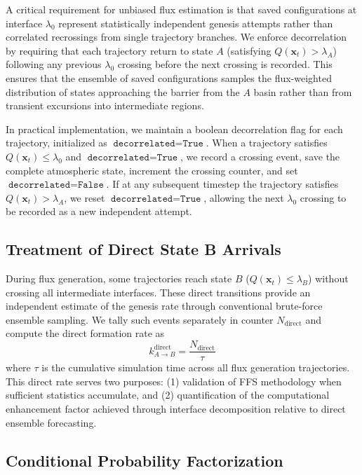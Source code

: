 \documentclass[11pt]{article}
\begin{document}
A critical requirement for unbiased flux estimation is that saved configurations at interface $\lambda_0$ represent statistically independent genesis attempts rather than correlated recrossings from single trajectory branches. We enforce decorrelation by requiring that each trajectory return to state $A$ (satisfying $Q(\mathbf{x}_t) > \lambda_A$) following any previous $\lambda_0$ crossing before the next crossing is recorded. This ensures that the ensemble of saved configurations samples the flux-weighted distribution of states approaching the barrier from the $A$ basin rather than from transient excursions into intermediate regions.

In practical implementation, we maintain a boolean decorrelation flag for each trajectory, initialized as $\texttt{decorrelated} = \texttt{True}$. When a trajectory satisfies $Q(\mathbf{x}_t) \leq \lambda_0$ and $\texttt{decorrelated} = \texttt{True}$, we record a crossing event, save the complete atmospheric state, increment the crossing counter, and set $\texttt{decorrelated} = \texttt{False}$. If at any subsequent timestep the trajectory satisfies $Q(\mathbf{x}_t) > \lambda_A$, we reset $\texttt{decorrelated} = \texttt{True}$, allowing the next $\lambda_0$ crossing to be recorded as a new independent attempt.

\subsection{Treatment of Direct State B Arrivals}

During flux generation, some trajectories reach state $B$ ($Q(\mathbf{x}_t) \leq \lambda_B$) without crossing all intermediate interfaces. These direct transitions provide an independent estimate of the genesis rate through conventional brute-force ensemble sampling. We tally such events separately in counter $N_{\text{direct}}$ and compute the direct formation rate as
\begin{equation}
k_{A \to B}^{\text{direct}} = \frac{N_{\text{direct}}}{\tau}
\end{equation}
where $\tau$ is the cumulative simulation time across all flux generation trajectories. This direct rate serves two purposes: (1) validation of FFS methodology when sufficient statistics accumulate, and (2) quantification of the computational enhancement factor achieved through interface decomposition relative to direct ensemble forecasting.

\subsection{Conditional Probability Factorization}
\end{document}
